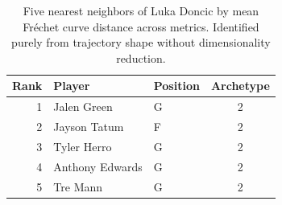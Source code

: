 \begin{table}[htbp]
  \centering\small
  \begin{tabular}{rllc}
    \toprule
    Rank & Player & Position & Archetype \\
    \midrule
    1 & Jalen Green & G & 2 \\
    2 & Jayson Tatum & F & 2 \\
    3 & Tyler Herro & G & 2 \\
    4 & Anthony Edwards & G & 2 \\
    5 & Tre Mann & G & 2 \\
    \bottomrule
  \end{tabular}
  \caption{Five nearest neighbors of Luka Doncic by mean Fr\'{e}chet curve distance across metrics. Identified purely from trajectory shape without dimensionality reduction.}
  \label{tab:Luka_Doncic_frechet_curve_neighbors}
\end{table}

